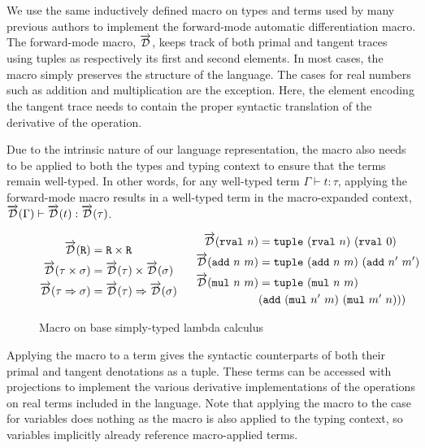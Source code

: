   We use the same inductively defined macro on types and terms used by many previous authors to implement the forward-mode automatic differentiation macro\cite{huot2020correctness}\cite{barthe2020versatility}\cite{Shaikha2019}.
  The forward-mode macro, $\overrightarrow{\mathcal{D}}$, keeps track of both primal and tangent traces using tuples as respectively its first and second elements.
  In most cases, the macro simply preserves the structure of the language.
  The cases for real numbers such as addition and multiplication are the exception.
  Here, the element encoding the tangent trace needs to contain the proper syntactic translation of the derivative of the operation.

  Due to the intrinsic nature of our language representation, the macro also needs to be applied to both the types and typing context to ensure that the terms remain well-typed.
  In other words, for any well-typed term $\Gamma \vdash t : \tau$, applying the forward-mode macro results in a well-typed term in the macro-expanded context, $\overrightarrow{\mathcal{D}}(\Gamma) \vdash \overrightarrow{\mathcal{D}}(t) : \overrightarrow{\mathcal{D}}(\tau)$.

  \begin{figure}
    \centering
    \begin{equation*}
      \begin{split}
        \overrightarrow{\mathcal{D}}(\texttt{R}) &= \texttt{R} \times \texttt{R} \\
        \overrightarrow{\mathcal{D}}(\tau \times \sigma) &= \overrightarrow{\mathcal{D}}(\tau) \times \overrightarrow{\mathcal{D}}(\sigma) \\
        \overrightarrow{\mathcal{D}}(\tau \Rightarrow \sigma) &= \overrightarrow{\mathcal{D}}(\tau) \Rightarrow \overrightarrow{\mathcal{D}}(\sigma)
      \end{split}
      \;\;\;\;\;\;
      \begin{split}
        \overrightarrow{\mathcal{D}}(\texttt{rval}\ n) &= \texttt{tuple}\ (\texttt{rval}\ n)\ (\texttt{rval}\ 0) \\
        \overrightarrow{\mathcal{D}}(\texttt{add}\ n\ m) &= \texttt{tuple}\ (\texttt{add}\ n\ m)\ (\texttt{add}\ n'\ m') \\
        \overrightarrow{\mathcal{D}}(\texttt{mul}\ n\ m) &= \texttt{tuple}\ (\texttt{mul}\ n\ m)\ \\
          &{(\texttt{add}\ (\texttt{mul}\ n'\ m)\ (\texttt{mul}\ m'\ n))})
      \end{split}
    \end{equation*}
    \caption{Macro on base simply-typed lambda calculus}
    \label{eqn:macro_base}
  \end{figure}

  Applying the macro to a term gives the syntactic counterparts of both their primal and tangent denotations as a tuple.
  These terms can be accessed with projections to implement the various derivative implementations of the operations on real terms included in the language.
  Note that applying the macro to the case for variables does nothing as the macro is also applied to the typing context, so variables implicitly already reference macro-applied terms.


